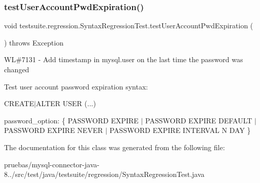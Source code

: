 \subsubsection{\texorpdfstring{test\+User\+Account\+Pwd\+Expiration()}{testUserAccountPwdExpiration()}}
{\footnotesize\ttfamily void testsuite.\+regression.\+Syntax\+Regression\+Test.\+test\+User\+Account\+Pwd\+Expiration (\begin{DoxyParamCaption}{ }\end{DoxyParamCaption}) throws Exception}

WL\#7131 -\/ Add timestamp in mysql.\+user on the last time the password was changed

Test user account password expiration syntax\+:

C\+R\+E\+A\+T\+E$\vert$\+A\+L\+T\+ER U\+S\+ER (...)
\begin{DoxyItemize}
\item password\+\_\+option\+: \{ P\+A\+S\+S\+W\+O\+RD E\+X\+P\+I\+RE $\vert$ P\+A\+S\+S\+W\+O\+RD E\+X\+P\+I\+RE D\+E\+F\+A\+U\+LT $\vert$ P\+A\+S\+S\+W\+O\+RD E\+X\+P\+I\+RE N\+E\+V\+ER $\vert$ P\+A\+S\+S\+W\+O\+RD E\+X\+P\+I\+RE I\+N\+T\+E\+R\+V\+AL N D\+AY \} 
\end{DoxyItemize}

The documentation for this class was generated from the following file\+:\begin{DoxyCompactItemize}
\item 
pruebas/mysql-\/connector-\/java-\/8../src/test/java/testsuite/regression/Syntax\+Regression\+Test.\+java\end{DoxyCompactItemize}
